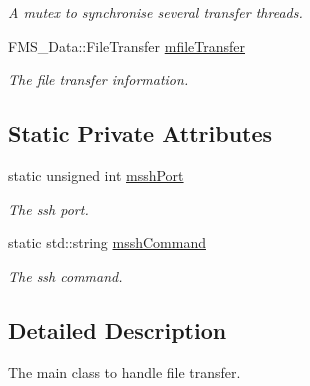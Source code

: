 \begin{DoxyCompactItemize}
\begin{DoxyCompactList}\small\item\em A mutex to synchronise several transfer threads. \item\end{DoxyCompactList}\item 
\hypertarget{classFileTransferServer_aff7f097316707ea0a0620f0aaf6e37a1}{
FMS\_\-Data::FileTransfer \hyperlink{classFileTransferServer_aff7f097316707ea0a0620f0aaf6e37a1}{mfileTransfer}}
\label{classFileTransferServer_aff7f097316707ea0a0620f0aaf6e37a1}

\begin{DoxyCompactList}\small\item\em The file transfer information. \item\end{DoxyCompactList}\end{DoxyCompactItemize}
\subsection*{Static Private Attributes}
\begin{DoxyCompactItemize}
\item 
\hypertarget{classFileTransferServer_a2c19a5bb38db230bab02e00b9453a81c}{
static unsigned int \hyperlink{classFileTransferServer_a2c19a5bb38db230bab02e00b9453a81c}{msshPort}}
\label{classFileTransferServer_a2c19a5bb38db230bab02e00b9453a81c}

\begin{DoxyCompactList}\small\item\em The ssh port. \item\end{DoxyCompactList}\item 
\hypertarget{classFileTransferServer_a32238020743cd582aa7bc6395a7ce99e}{
static std::string \hyperlink{classFileTransferServer_a32238020743cd582aa7bc6395a7ce99e}{msshCommand}}
\label{classFileTransferServer_a32238020743cd582aa7bc6395a7ce99e}

\begin{DoxyCompactList}\small\item\em The ssh command. \item\end{DoxyCompactList}\end{DoxyCompactItemize}


\subsection{Detailed Description}
The main class to handle file transfer. 

